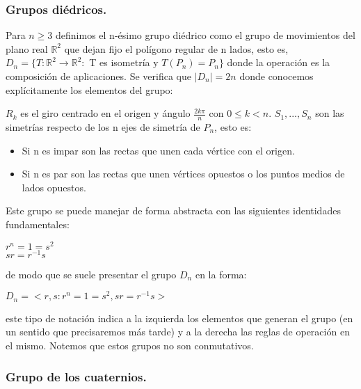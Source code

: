 \subsubsection{Grupos diédricos.}

Para $n \ge 3$ definimos el n-ésimo grupo diédrico como el grupo de movimientos del plano real $\mathbb{R}^2$ que dejan fijo el polígono regular de n lados, esto es, $D_n = \{T:\mathbb{R}^2 \rightarrow \mathbb{R}^2 :$ T es isometría  y  $T(P_n) = P_n\}$ donde la operación es la composición de aplicaciones. Se verifica que $|D_n| = 2n$ donde conocemos explícitamente los elementos del grupo:

$R_k$ es el giro centrado en el origen y ángulo $\frac{2k\pi}{n}$ con $0 \le k < n$.
$S_1,...,S_n$ son las simetrías respecto de los n ejes de simetría de $P_n$, esto es:
\begin{itemize}
\item Si n es impar son las rectas que unen cada vértice con el origen.
\item Si n es par son las rectas que unen vértices opuestos o los puntos medios de lados opuestos.
\end{itemize}
  
Este grupo se puede manejar de forma abstracta con las siguientes identidades fundamentales:

$r^n = 1 = s^2$\\
$sr = r^{-1}s$

de modo que se suele presentar el grupo $D_n$ en la forma:

$D_n = <r,s : r^n = 1 = s^2,sr = r^{-1}s>$

este tipo de notación indica a la izquierda los elementos que generan el grupo (en un sentido que precisaremos más tarde) y a la derecha las reglas de operación en el mismo. Notemos que estos grupos no son conmutativos.

\subsubsection{Grupo de los cuaternios.}


